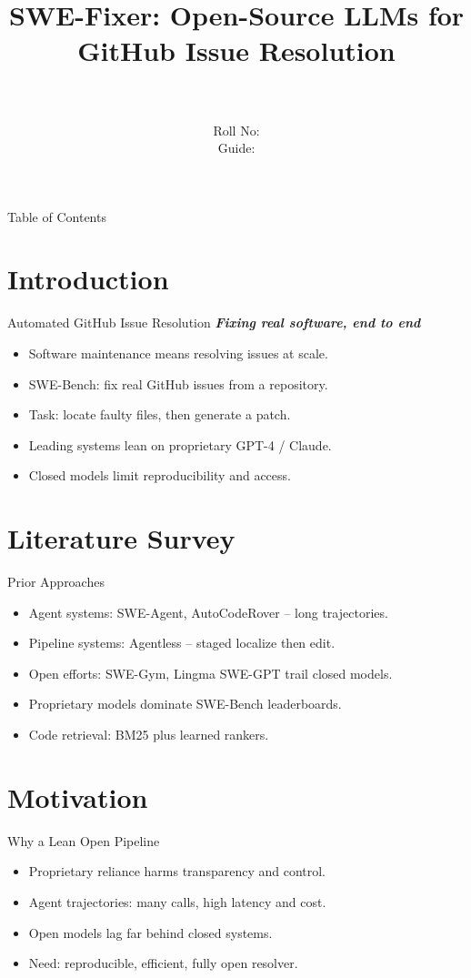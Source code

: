 \documentclass{beamer}
\title[\seminarShortTitle]{SWE-Fixer: Open-Source LLMs for GitHub Issue Resolution}
\author[\seminarName\ (\seminarShortCollege)]{\seminarName \\ \seminarRoll \\ Roll No: \seminarClassRoll \\ Guide: \seminarGuide}
\institute[\seminarShortCollege]{\seminarDept \\ \seminarCollege}
\date{\seminarDate}
\begin{document}
\begin{frame}\titlepage\end{frame}
\begin{frame}{Table of Contents}\tableofcontents\end{frame}
\section{Introduction}
\begin{frame}{Automated GitHub Issue Resolution}
\textbf{\textit{Fixing real software, end to end}}
\begin{itemize}
\item Software maintenance means resolving issues at scale.
\item SWE-Bench: fix real GitHub issues from a repository.
\item Task: locate faulty files, then generate a patch.
\item Leading systems lean on proprietary GPT-4 / Claude.
\item Closed models limit reproducibility and access.
\end{itemize}
\end{frame}

\section{Literature Survey}
\begin{frame}{Prior Approaches}
\begin{itemize}
\item Agent systems: SWE-Agent, AutoCodeRover -- long trajectories.
\item Pipeline systems: Agentless -- staged localize then edit.
\item Open efforts: SWE-Gym, Lingma SWE-GPT trail closed models.
\item Proprietary models dominate SWE-Bench leaderboards.
\item Code retrieval: BM25 plus learned rankers.
\end{itemize}
\end{frame}

\section{Motivation}
\begin{frame}{Why a Lean Open Pipeline}
\begin{itemize}
\item Proprietary reliance harms transparency and control.
\item Agent trajectories: many calls, high latency and cost.
\item Open models lag far behind closed systems.
\item Need: reproducible, efficient, fully open resolver.
\end{itemize}
\end{frame}
\end{document}
